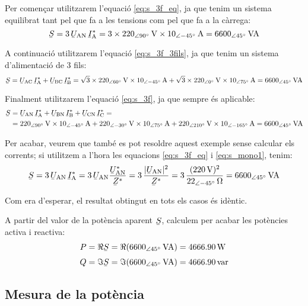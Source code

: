 \begin{exemple}
    Per començar  utilitzarem l'equació \eqref{eq:s_3f_eq}, ja que tenim
    un sistema equilibrat tant pel que fa a les tensions com pel que fa a la càrrega:
    \[
    \cmplx{S} = 3\,\cmplx{U}\ped{AN} \,\cmplx{I}\ped{A}^* =
    3\times \SIpd{220}{90}{V} \times
    \SIpd{10}{-45}{A} = \SIpd{6600}{45}{VA}
    \]

    A continuació  utilitzarem l'equació \eqref{eq:s_3f_3fils}, ja que tenim
    un sistema d'alimentació de 3 fils:
    \[
    \cmplx{S} = \cmplx{U}\ped{AC} \,\cmplx{I}\ped{A}^*
     +  \cmplx{U}\ped{BC} \,\cmplx{I}\ped{B}^* =
    \sqrt{3}\times \SIpd{220}{60}{V} \times
    \SIpd{10}{-45}{A} + \sqrt{3}\times \SIpd{220}{0}{V}
    \times \SIpd{10}{75}{A}  = \SIpd{6600}{45}{VA}
    \]

     Finalment  utilitzarem l'equació \eqref{eq:s_3f}, ja que
     sempre és aplicable:
     \[\begin{split}
     \cmplx{S} &=  \cmplx{U}\ped{AN} \,\cmplx{I}\ped{A}^* +
     \cmplx{U}\ped{BN} \,\cmplx{I}\ped{B}^* +  \cmplx{U}\ped{CN}\,
     \cmplx{I}\ped{C}^* =\\
     &= \SIpd{220}{90}{V}
     \times \SIpd{10}{-45}{A} + \SIpd{220}{-30}{V} \times \SIpd{10}{75}{A}
     + \SIpd{220}{210}{V} \times \SIpd{10}{-165}{A} = \SIpd{6600}{45}{VA}
     \end{split} \]

    Per acabar, veurem que també es pot resoldre aquest exemple
    sense calcular els corrents; si utilitzem a l'hora les
    equacions \eqref{eq:s_3f_eq} i \eqref{eq:s_mono1}, tenim:
    \[
    \cmplx{S} = 3\,\cmplx{U}\ped{AN} \,\cmplx{I}\ped{A}^* =
    3\,\cmplx{U}\ped{AN}\frac{\cmplx{U}\ped{AN}^*}{\cmplx{Z}^*} =
    3\, \frac{|\cmplx{U}\ped{AN}|^2}{\cmplx{Z}^*} =
    3 \, \frac{(\SI{220}{V})^2}{\SIpd{22}{-45}{\ohm}} =
    \SIpd{6600}{45}{VA}
    \]

    Com era d'esperar, el resultat obtingut en tots els casos
    és idèntic.

    A partir del valor de la potència aparent $\cmplx{S}$, calculem per acabar les potències activa i reactiva:
    \begin{align*}
        P &= \Re\cmplx{S} = \Re(\SIpd{6600}{45}{VA}) = \SI{4666,90}{W}\\[1mm]
        Q &= \Im\cmplx{S} = \Im(\SIpd{6600}{45}{VA}) = \SI{4666,90}{var}
    \end{align*}

\end{exemple}

\subsection{Mesura de la potència}

